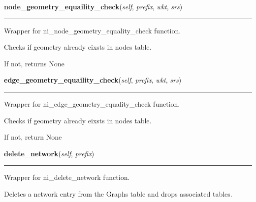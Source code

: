     \vspace{0.5ex}

\hspace{.8\funcindent}\begin{boxedminipage}{\funcwidth}

    \raggedright \textbf{node\_geometry\_equaility\_check}(\textit{self}, \textit{prefix}, \textit{wkt}, \textit{srs})

    \vspace{-1.5ex}

    \rule{\textwidth}{0.5\fboxrule}
\setlength{\parskip}{2ex}
    Wrapper for ni\_node\_geometry\_equality\_check function.

    Checks if geometry already eixsts in nodes table.

    If not, returns None

\setlength{\parskip}{1ex}
    \end{boxedminipage}

    \label{nx_pgnet:nisql:edge_geometry_equaility_check}

    \vspace{0.5ex}

\hspace{.8\funcindent}\begin{boxedminipage}{\funcwidth}

    \raggedright \textbf{edge\_geometry\_equaility\_check}(\textit{self}, \textit{prefix}, \textit{wkt}, \textit{srs})

    \vspace{-1.5ex}

    \rule{\textwidth}{0.5\fboxrule}
\setlength{\parskip}{2ex}
    Wrapper for ni\_edge\_geometry\_equality\_check function.

    Checks if geometry already eixsts in nodes table.

    If not, return None

\setlength{\parskip}{1ex}
    \end{boxedminipage}

    \label{nx_pgnet:nisql:delete_network}

    \vspace{0.5ex}

\hspace{.8\funcindent}\begin{boxedminipage}{\funcwidth}

    \raggedright \textbf{delete\_network}(\textit{self}, \textit{prefix})

    \vspace{-1.5ex}

    \rule{\textwidth}{0.5\fboxrule}
\setlength{\parskip}{2ex}
    Wrapper for ni\_delete\_network function.

    Deletes a network entry from the Graphs table and drops associated 
    tables.

\setlength{\parskip}{1ex}
    \end{boxedminipage}

